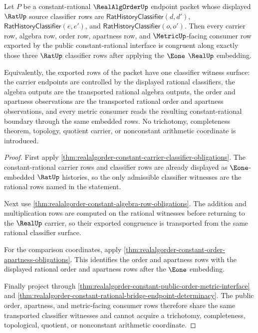 \begin{theorem}
\label{thm:realalgorder-constant-transported-classifier-congruence}
Let $P$ be a constant-rational $\RealAlgOrderUp$ endpoint packet whose displayed
$\RatUp$ source classifier rows are
$\mathsf{RatHistoryClassifier}(d,d')$,
$\mathsf{RatHistoryClassifier}(e,e')$, and
$\mathsf{RatHistoryClassifier}(o,o')$. Then every carrier row, algebra row,
order row, apartness row, and $\MetricUp$-facing consumer row exported by the
public constant-rational interface is congruent along exactly those three
$\RatUp$ classifier rows after applying the $\Eone$ $\RealUp$ embedding.

Equivalently, the exported rows of the packet have one classifier witness
surface: the carrier endpoints are controlled by the displayed rational
classifiers, the algebra outputs are the transported rational algebra outputs,
the order and apartness observations are the transported rational order and
apartness observations, and every metric consumer reads the resulting
constant-rational boundary through the same embedded rows. No trichotomy,
completeness theorem, topology, quotient carrier, or nonconstant arithmetic
coordinate is introduced.
\end{theorem}
\begin{proof}
First apply
\autoref{thm:realalgorder-constant-carrier-classifier-obligations}. The
constant-rational carrier rows and classifier rows are already displayed as
$\Eone$-embedded $\RatUp$ histories, so the only admissible classifier witnesses
are the rational rows named in the statement.

Next use
\autoref{thm:realalgorder-constant-algebra-row-obligations}. The addition and
multiplication rows are computed on the rational witnesses before returning to
the $\RealUp$ carrier, so their exported congruence is transported from the same
rational classifier surface.

For the comparison coordinates, apply
\autoref{thm:realalgorder-constant-order-apartness-obligations}. This identifies
the order and apartness rows with the displayed rational order and apartness
rows after the $\Eone$ embedding.

Finally project through
\autoref{thm:realalgorder-constant-public-order-metric-interface} and
\autoref{thm:realalgorder-constant-rational-bridge-endpoint-determinacy}. The
public order, apartness, and metric-facing consumer rows therefore share the
same transported classifier witnesses and cannot acquire a trichotomy,
completeness, topological, quotient, or nonconstant arithmetic coordinate.
\end{proof}

